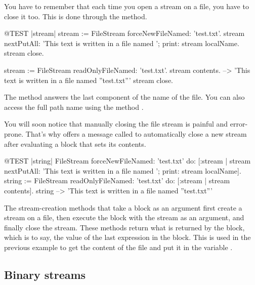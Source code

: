 \documentclass[a4paper,10pt,twoside]{book}
\begin{document}
You have to remember that each time you open a stream on a file, you
have to close it too. This is done through the  method.

\begin{code}{@TEST |stream|}
stream := FileStream forceNewFileNamed: 'test.txt'.
stream
    nextPutAll: 'This text is written in a file named ';
    print: stream localName.
stream close.

stream := FileStream readOnlyFileNamed: 'test.txt'.
stream contents. --> 'This text is written in a file named ''test.txt'''
stream close.
\end{code}



The method  answers the last component of the name of the file. You can
also access the full path name using the method
.

You will soon notice that manually closing the file stream is
painful and error-prone. That's why  offers a message called  to
automatically close a new stream after evaluating a block that
sets its contents.

\begin{code}{@TEST |string|}
FileStream
    forceNewFileNamed: 'test.txt'
    do: [:stream |
        stream
            nextPutAll: 'This text is written in a file named ';
            print: stream localName].
string := FileStream
            readOnlyFileNamed: 'test.txt'
            do: [:stream | stream contents].
string --> 'This text is written in a file named ''test.txt'''
\end{code}

The stream-creation methods that take a block as an argument first
create a stream on a file, then execute the block with the stream
as an argument, and finally close the stream. These methods return what
is returned by the block, which is to say, the value of the last
expression in the block. This is used in the previous example to get
the content of the file and put it in the variable .

\subsection{Binary streams}
\end{document}
